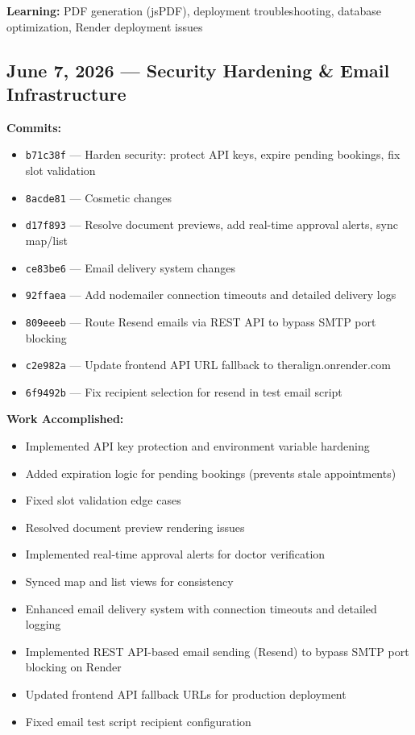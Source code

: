 \documentclass[11pt,a4paper]{article}
\begin{document}
\textbf{Learning:} PDF generation (jsPDF), deployment troubleshooting, database optimization,
Render deployment issues

\subsection{June 7, 2026 — Security Hardening \& Email Infrastructure}

\textbf{Commits:}
\begin{itemize}
  \item \texttt{b71c38f} — Harden security: protect API keys, expire pending bookings, fix slot validation
  \item \texttt{8acde81} — Cosmetic changes
  \item \texttt{d17f893} — Resolve document previews, add real-time approval alerts, sync map/list
  \item \texttt{ce83be6} — Email delivery system changes
  \item \texttt{92ffaea} — Add nodemailer connection timeouts and detailed delivery logs
  \item \texttt{809eeeb} — Route Resend emails via REST API to bypass SMTP port blocking
  \item \texttt{c2e982a} — Update frontend API URL fallback to theralign.onrender.com
  \item \texttt{6f9492b} — Fix recipient selection for resend in test email script
\end{itemize}

\textbf{Work Accomplished:}
\begin{itemize}
  \item Implemented API key protection and environment variable hardening
  \item Added expiration logic for pending bookings (prevents stale appointments)
  \item Fixed slot validation edge cases
  \item Resolved document preview rendering issues
  \item Implemented real-time approval alerts for doctor verification
  \item Synced map and list views for consistency
  \item Enhanced email delivery system with connection timeouts and detailed logging
  \item Implemented REST API-based email sending (Resend) to bypass SMTP port blocking on Render
  \item Updated frontend API fallback URLs for production deployment
  \item Fixed email test script recipient configuration
\end{itemize}
\end{document}
